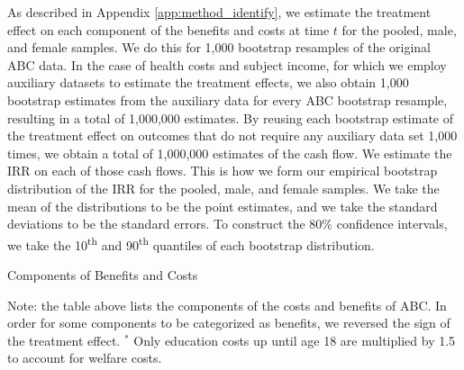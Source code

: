 \noindent As described in Appendix \ref{app:method_identify}, we estimate the treatment effect on each
component of the benefits and costs at time $t$ for the pooled, male, and
female samples. We do this for 1,000 bootstrap resamples of the original ABC data.
In the case of health costs and subject income, for which we employ auxiliary datasets to
estimate the treatment effects, we also obtain 1,000 bootstrap estimates from the auxiliary data
for every ABC bootstrap resample, resulting in a total of 1,000,000 estimates.
By reusing each bootstrap estimate of the treatment effect on outcomes that do not require any auxiliary data
set 1,000 times, we obtain a total of 1,000,000 estimates of the cash flow.
We estimate the IRR on each of those cash flows.
This is how we form our empirical bootstrap distribution of the IRR for the pooled, male, and female samples.
We take the mean of the distributions to be the point estimates, and we take the standard deviations
to be the standard errors. To construct the 80\% confidence intervals, we take the 10\textsuperscript{th}
and 90\textsuperscript{th} quantiles of each bootstrap distribution. \\

\begin{table}[H]
\begin{threeparttable}
\caption{Components of Benefits and Costs}
\label{table:bc_comp}
\centering

\begin{tablenotes}
\tiny
\item Note: the table above lists the components of the costs and benefits of ABC.
In order for some components to be categorized as benefits, we reversed the sign
of the treatment effect. $^{*}$ Only education costs up until age 18 are multiplied by 1.5 to account for welfare costs.
\end{tablenotes}
\end{threeparttable}
\end{table}





